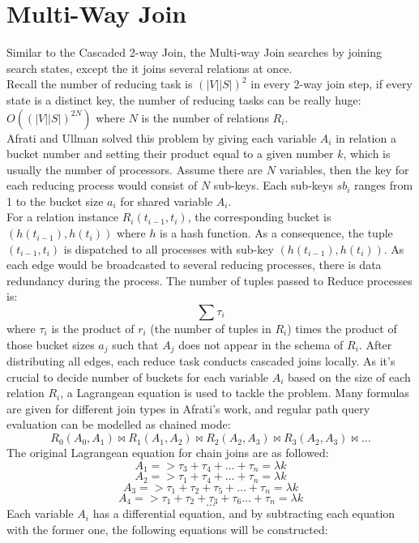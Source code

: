 \chapter{\label{cha:multi-way}Multi-Way Join}
Similar to the Cascaded 2-way Join, the Multi-way Join searches by joining search states, except the it joins several relations at once.\\
Recall the number of reducing task is $(|V||S|)^2$ in every 2-way join step, if every state is a distinct key, the number of reducing tasks can be really huge: $O((|V||S|)^{2N})$ where $N$ is the number of relations $R_i$.\\ 
Afrati and Ullman\cite{afrati2010optimizing} solved this problem by giving each variable $A_i$ in relation a bucket number and setting their product equal to a given number $k$, which is usually the number of processors. Assume there are $N$ variables, then the key for each reducing process would consist of $N$ sub-keys. Each sub-keys $sb_i$ ranges from 1 to the bucket size $a_i$ for shared variable $A_i$.\\
For a relation instance $R_i(t_{i-1},t_i)$, the corresponding bucket is $(h(t_{i-1}),h(t_i))$ where $h$ is a hash function. As a consequence, the tuple $(t_{i-1},t_{i})$ is dispatched to all processes with sub-key $(h(t_{i-1}),h(t_i))$. As each edge would be broadcasted to several reducing processes, there is data redundancy during the process. The number of tuples passed to Reduce processes is:
$$\sum\tau_i$$
where $\tau_i$ is the product of $r_i$ (the number of tuples in $R_i$) times the product of those bucket sizes $a_j$ such that $A_j$ does not appear in the schema of $R_i$.
 After distributing all edges, each reduce task conducts cascaded joins locally. As it's crucial to decide number of buckets for each variable $A_i$ based on the size of each relation $R_i$, a Lagrangean equation is used to tackle the problem. Many formulas are given for different join types in Afrati's work, and regular path query evaluation can be modelled as chained mode:
$$R_0(A_0,A_1)\bowtie R_1(A_1,A_2)\bowtie R_2(A_2,A_3)\bowtie R_3(A_2,A_3)\bowtie...$$
The original Lagrangean equation for chain joins are as followed:
$$A_1 => \tau_3 + \tau_4 + ... + \tau_n = \lambda k$$
$$A_2 => \tau_1 + \tau_4 + ... + \tau_n = \lambda k$$
$$A_3 => \tau_1 + \tau_2 + \tau_5 + ... + \tau_n = \lambda k$$
$$A_4 => \tau_1 + \tau_2 + \tau_3 + \tau_6... + \tau_n = \lambda k$$
$$...$$
 Each variable $A_i$ has a differential equation, and by subtracting each equation with the former one, the following equations will be constructed:
